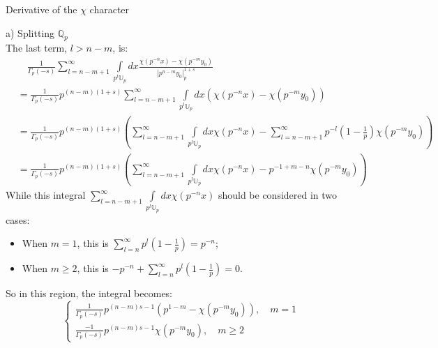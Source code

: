 \documentclass[12pt]{article}
\begin{document}
\begin{section}{Derivative of the $\chi$ character}
\begin{paragraph}{a) Splitting $\mathbb{Q}_p$}
\begin{equation}
\end{equation}
The last term, $l>n-m$, is:
\begin{equation}
\begin{split}
&\quad\frac{1}{\Gamma_p (-s)} \sum_{l=n-m+1}^{\infty} \int\limits _{p^l \mathbb{U}_p}dx\frac{\chi( p^{-n} x) - \chi( p^{-m}y_0)}{|p^{n-m}y_0|_p^{1+s}}\\
&=\frac{1}{\Gamma_p (-s)} p^{(n-m)(1+s)} \sum_{l=n-m+1}^{\infty} \int\limits _{p^l \mathbb{U}_p}dx (\chi( p^{-n} x) - \chi( p^{-m}y_0))\\
&=\frac{1}{\Gamma_p (-s)} p^{(n-m)(1+s)} (\sum_{l=n-m+1}^{\infty} \int\limits _{p^l \mathbb{U}_p}dx \chi( p^{-n} x) - \sum_{l=n-m+1}^{\infty} p^{-l}(1-\frac{1}{p})\chi( p^{-m}y_0))\\
&=\frac{1}{\Gamma_p (-s)} p^{(n-m)(1+s)} (\sum_{l=n-m+1}^{\infty} \int\limits _{p^l \mathbb{U}_p}dx \chi( p^{-n} x) - p^{-1+m-n}\chi( p^{-m}y_0))
\end{split}
\end{equation}
While this integral $\sum_{l=n-m+1}^{\infty}\int\limits _{p^l \mathbb{U}_p}dx \chi( p^{-n} x)$ should be considered in two cases: \\
\begin{itemize}
\item When $m=1$, this is $\sum^\infty_{l=n}p^l(1-\frac{1}{p})=p^{-n}$;
\item When $m\geq 2$, this is $-p^{-n}+\sum^\infty_{l=n}p^l(1-\frac{1}{p})=0$.
\end{itemize}
So in this region, the integral becomes:
\begin{equation}
\begin{cases}
\frac{1}{\Gamma_p (-s)} p^{(n-m)s-1} (p^{1-m} - \chi( p^{-m}y_0)), \quad m=1\\
\frac{-1}{\Gamma_p (-s)} p^{(n-m)s-1} \chi( p^{-m}y_0), \quad m\geq 2
\end{cases}
\end{equation}
\end{paragraph}

\end{section}
\end{document}
